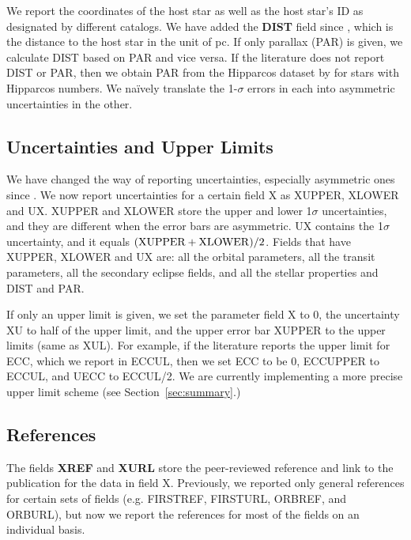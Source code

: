 \documentclass[11pt,preprint]{aastex}
\begin{document}
\begin{CJK*}{UTF8}{gbsn}
We report the coordinates of the host star as well as the host star's
ID as designated by different catalogs.  We have added the {\bf DIST} field since
\cite{Wright2011}, which is the distance to the host star in the unit
of pc. If only parallax (PAR) is given, we calculate DIST based on PAR
and vice versa. If the literature does not report DIST or PAR, then we
obtain PAR from the Hipparcos dataset by \cite{van Leeuwen2009} for
stars with Hipparcos numbers. We na\"ively translate the 1-$\sigma$ errors in each into asymmetric
uncertainties in the other.

\subsection{Uncertainties and Upper Limits}\label{sec:unc}

We have changed the way of reporting uncertainties, especially
asymmetric ones since \cite{Wright2011}. We now report
uncertainties for a certain field X as XUPPER, XLOWER and UX. XUPPER
and XLOWER store the upper and lower 1$\sigma$ uncertainties, and they
are different when the error bars are asymmetric. UX contains the
1$\sigma$ uncertainty, and it equals $({\rm XUPPER+XLOWER})/2$. Fields
that have XUPPER, XLOWER and UX are: all the orbital parameters, all
the transit parameters, all the secondary eclipse fields, and all the stellar
properties and DIST and PAR.


If only an upper limit is given, we set the parameter field X to 0,
the uncertainty XU to half of the upper limit, and the upper error bar
XUPPER to the upper limits (same as XUL). For example, if the
literature reports the upper limit for ECC, which we report in ECCUL,
then we set ECC to be 0, ECCUPPER to ECCUL, and UECC to ECCUL/2.  We
are currently implementing a more precise upper limit scheme (see Section~\ref{sec:summary}.)

\subsection{References}\label{sec:ref}

The fields {\bf XREF} and {\bf XURL} store the peer-reviewed reference
and link to the publication for the data in field X. Previously, we 
reported only general references for certain sets of fields (e.g. FIRSTREF,
FIRSTURL, ORBREF, and ORBURL), but now we report the references for
most of the fields on an individual basis.


\end{CJK*}
\end{document}
